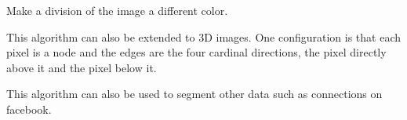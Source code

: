 \begin{problem}
Make a division of the image a different color.
\end{problem}

This algorithm can also be extended to 3D images. One configuration is that each pixel is a node and the edges are the four cardinal directions, the pixel directly above it and the pixel below it.

This algorithm can also be used to segment other data such as connections on facebook. 
